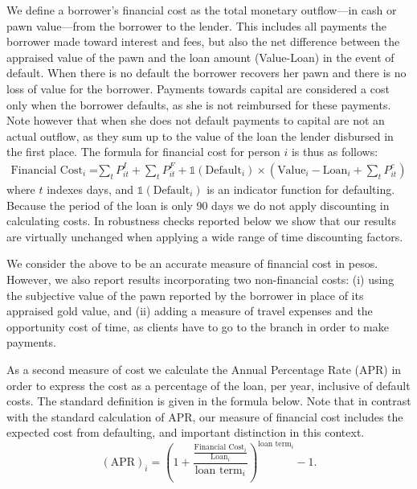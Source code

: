 \documentclass[12pt, a4paper, colorinlistoftodos]{article}
\begin{document}
We define a borrower's financial cost as the total monetary outflow---in cash or pawn value---from the borrower to the lender. This includes all payments the borrower made toward interest and fees, but also the net difference between the appraised value of the pawn and the loan amount (Value-Loan) in the event of default. When there is no default the borrower recovers her pawn and there is no loss of value for the borrower. Payments towards capital are considered a cost only when the borrower defaults, as she is not reimbursed for these payments. Note however that when she does not default payments to capital are not an actual outflow, as they sum up to the value of the loan the lender disbursed in the first place. The formula for financial cost for person $i$ is thus as follows: %
\begin{align*}
    \text{Financial Cost}_i =&  \sum_t P^I_{it} +\sum_t P^F_{it}  
     + \mathds{1}(\text{Default}_i) \times \left(\text{Value}_i-\text{Loan}_i + \sum_t P^c_{it}\right)
\end{align*}
where $t$ indexes days, and $\mathds{1}(\text{Default}_i)$ is an indicator function for defaulting. Because the period of the loan is only 90 days we do not apply discounting in calculating costs.  In robustness checks reported below we show that our results are virtually unchanged when applying a wide range of time discounting factors.

We consider the above to be an accurate measure of financial cost in pesos. However, we also report results incorporating two non-financial costs: (i) using the subjective value of the pawn reported by the borrower in place of its appraised gold value, and (ii) adding a measure of travel expenses and the opportunity cost of time, as clients have to go to the branch in order to make payments.

As a second measure of cost we calculate the Annual Percentage Rate (APR) in order to express the cost as a percentage of the loan, per year, inclusive of default costs. The standard definition is given in the formula below. Note that in contrast with the standard calculation of APR, our measure of financial cost includes the expected cost from defaulting, and important distinction in this context. 
$$(\text{APR})_i =\left( 1 + \frac{\frac{\text{Financial Cost}_i}{\text{Loan}_i}}{\text{loan term}_i}\right)^{\text{loan term}_i}-1 .$$
\end{document}
